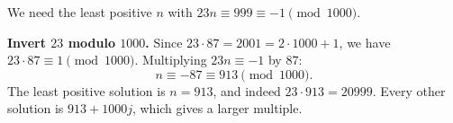 We need the least positive $n$ with $23n\equiv999\equiv-1\pmod{1000}$.

\textbf{Invert $23$ modulo $1000$.} Since $23\cdot87=2001=2\cdot1000+1$, we have $23\cdot87\equiv1\pmod{1000}$. Multiplying $23n\equiv-1$ by $87$:
\[
n\equiv-87\equiv913\pmod{1000}.
\]
The least positive solution is $n=\boxed{913}$, and indeed $23\cdot913=20999$. Every other solution is $913+1000j$, which gives a larger multiple.
